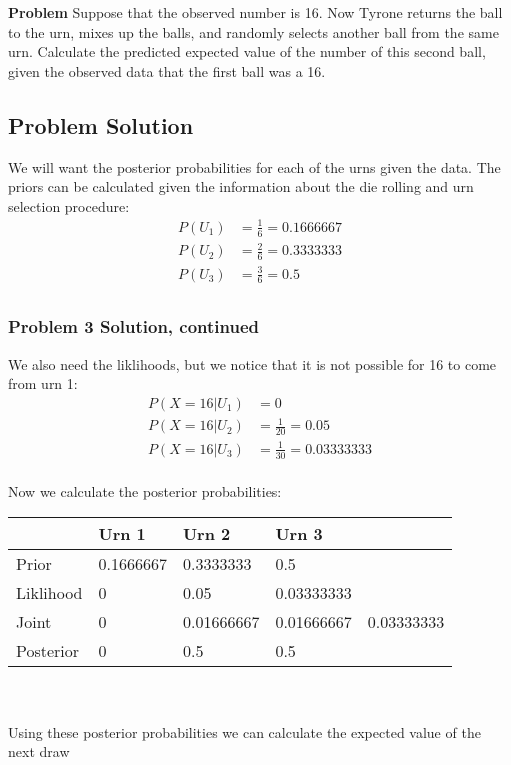 \documentclass[12pt]{article}
\theoremstyle{definition}
\begin{document}
\bigskip
\noindent
{\bf Problem} Suppose that the observed number is 16. Now Tyrone returns the ball to the urn, mixes up the balls, and randomly selects another ball from the same urn. Calculate the predicted expected value of the number of this second ball, given the observed data that the first ball was a 16.

\subsection*{Problem Solution}

We will want the posterior probabilities for each of the urns given the data.
The priors can be calculated given the information about the die rolling and urn selection procedure:\\
\begin{align*}
P(U_1) &= \frac{1}{6} = 0.1666667\\
P(U_2) &= \frac{2}{6} = 0.3333333\\
P(U_3) &= \frac{3}{6} = 0.5\\
\end{align*}

\newpage
\subsubsection*{Problem 3 Solution, continued}

We also need the liklihoods, but we notice that it is not possible for 16 to come from urn 1:
\begin{align*}
P(X=16|U_1) &= 0\\
P(X=16|U_2) &= \frac{1}{20} = 0.05\\
P(X=16|U_3) &= \frac{1}{30} = 0.03333333\\
\end{align*}

Now we calculate the posterior probabilities:\\

\begin{tabular}{lllll}
&   Urn 1   &   Urn 2   &   Urn 3   \\
\hline
Prior      &   0.1666667   &   0.3333333   &   0.5   &\\
Liklihood  &   0   &   0.05   &   0.03333333   &\\
Joint      &   0   &   0.01666667   &   0.01666667   &   0.03333333\\
Posterior  &   0   &   0.5   &   0.5   &\\
\hline
\end{tabular}
\\\\
Using these posterior probabilities we can calculate the expected value of the next draw
\end{document}

